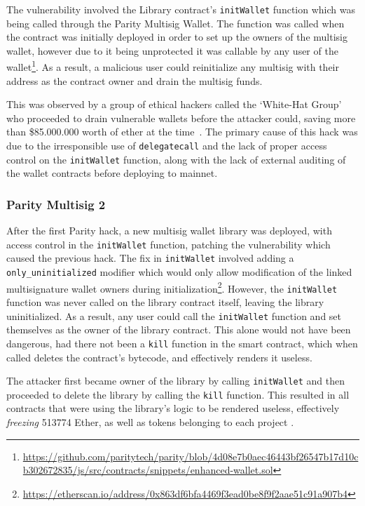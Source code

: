 The vulnerability involved the Library contract's \texttt{initWallet} function which was being called through the Parity Multisig Wallet. The function was called when the contract was initially deployed in order to set up the owners of the multisig wallet, however due to it being unprotected it was callable by any user of the wallet\footnote{\url{https://github.com/paritytech/parity/blob/4d08e7b0aec46443bf26547b17d10cb302672835/js/src/contracts/snippets/enhanced-wallet.sol}}. As a result, a malicious user could reinitialize any multisig with their address as the contract owner and drain the multisig funds.

This was observed by a group of ethical hackers called the `White-Hat Group' who proceeded to drain vulnerable wallets before the attacker could, saving more than \$85.000.000 worth of ether at the time~\cite{swarm-parity}. The primary cause of this hack was due to the irresponsible use of \texttt{delegatecall} and the lack of proper access control on the \texttt{initWallet} function, along with the lack of external auditing of the wallet contracts before deploying to mainnet.

\subsubsection{Parity Multisig 2}
After the first Parity hack, a new multisig wallet library was deployed, with access control in the \texttt{initWallet} function, patching the vulnerability which caused the previous hack. The fix in \texttt{initWallet} involved adding a \texttt{only\_uninitialized} modifier which would only allow modification of the linked multisignature wallet owners during initialization\footnote{\url{https://etherscan.io/address/0x863df6bfa4469f3ead0be8f9f2aae51c91a907b4}}. However, the \texttt{initWallet} function was never called on the library contract itself, leaving the library uninitialized. As a result, any user could call the \texttt{initWallet} function and set themselves as the owner of the library contract. This alone would not have been dangerous, had there not been a \texttt{kill} function in the smart contract, which when called deletes the contract's bytecode, and effectively renders it useless. 

The attacker first became owner of the library by calling \texttt{initWallet} and then proceeded to delete the library by calling the \texttt{kill} function. This resulted in all contracts that were using the library's logic to be rendered useless, effectively \textit{freezing} 513774 Ether, as well as tokens belonging to each project \cite{paritypostmortem}. 

